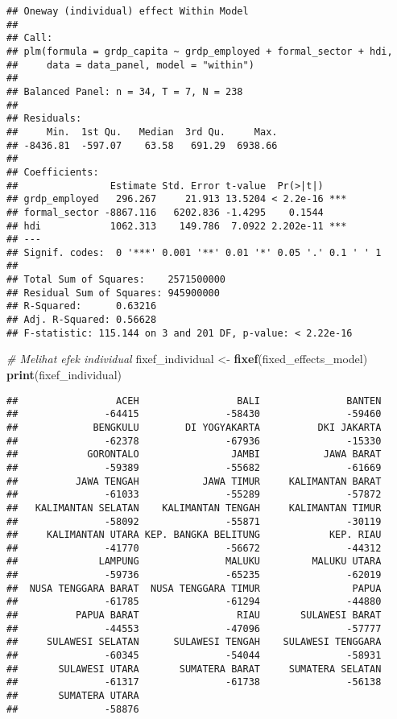 \documentclass[
]{article}
\newenvironment{Shaded}{\begin{snugshade}}{\end{snugshade}}
\newcommand{\CommentTok}[1]{\textcolor[rgb]{0.56,0.35,0.01}{\textit{#1}}}
\newcommand{\FunctionTok}[1]{\textcolor[rgb]{0.13,0.29,0.53}{\textbf{#1}}}
\newcommand{\NormalTok}[1]{#1}
\newcommand{\OtherTok}[1]{\textcolor[rgb]{0.56,0.35,0.01}{#1}}
\begin{document}
\begin{verbatim}
## Oneway (individual) effect Within Model
## 
## Call:
## plm(formula = grdp_capita ~ grdp_employed + formal_sector + hdi, 
##     data = data_panel, model = "within")
## 
## Balanced Panel: n = 34, T = 7, N = 238
## 
## Residuals:
##     Min.  1st Qu.   Median  3rd Qu.     Max. 
## -8436.81  -597.07    63.58   691.29  6938.66 
## 
## Coefficients:
##                Estimate Std. Error t-value  Pr(>|t|)    
## grdp_employed   296.267     21.913 13.5204 < 2.2e-16 ***
## formal_sector -8867.116   6202.836 -1.4295    0.1544    
## hdi            1062.313    149.786  7.0922 2.202e-11 ***
## ---
## Signif. codes:  0 '***' 0.001 '**' 0.01 '*' 0.05 '.' 0.1 ' ' 1
## 
## Total Sum of Squares:    2571500000
## Residual Sum of Squares: 945900000
## R-Squared:      0.63216
## Adj. R-Squared: 0.56628
## F-statistic: 115.144 on 3 and 201 DF, p-value: < 2.22e-16
\end{verbatim}

\begin{Shaded}
\begin{Highlighting}[]
\CommentTok{\# Melihat efek individual}
\NormalTok{fixef\_individual }\OtherTok{\textless{}{-}} \FunctionTok{fixef}\NormalTok{(fixed\_effects\_model)  }
\FunctionTok{print}\NormalTok{(fixef\_individual)}
\end{Highlighting}
\end{Shaded}

\begin{verbatim}
##                 ACEH                 BALI               BANTEN 
##               -64415               -58430               -59460 
##             BENGKULU        DI YOGYAKARTA          DKI JAKARTA 
##               -62378               -67936               -15330 
##            GORONTALO                JAMBI           JAWA BARAT 
##               -59389               -55682               -61669 
##          JAWA TENGAH           JAWA TIMUR     KALIMANTAN BARAT 
##               -61033               -55289               -57872 
##   KALIMANTAN SELATAN    KALIMANTAN TENGAH     KALIMANTAN TIMUR 
##               -58092               -55871               -30119 
##     KALIMANTAN UTARA KEP. BANGKA BELITUNG            KEP. RIAU 
##               -41770               -56672               -44312 
##              LAMPUNG               MALUKU         MALUKU UTARA 
##               -59736               -65235               -62019 
##  NUSA TENGGARA BARAT  NUSA TENGGARA TIMUR                PAPUA 
##               -61785               -61294               -44880 
##          PAPUA BARAT                 RIAU       SULAWESI BARAT 
##               -44553               -47096               -57777 
##     SULAWESI SELATAN      SULAWESI TENGAH    SULAWESI TENGGARA 
##               -60345               -54044               -58931 
##       SULAWESI UTARA       SUMATERA BARAT     SUMATERA SELATAN 
##               -61317               -61738               -56138 
##       SUMATERA UTARA 
##               -58876
\end{verbatim}
\end{document}
